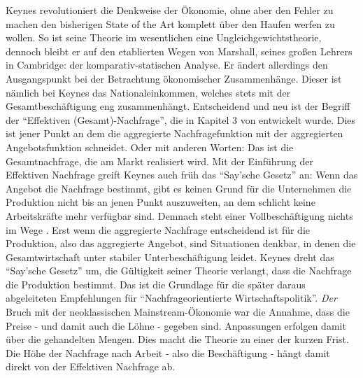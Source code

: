 Keynes revolutioniert die Denkweise der Ökonomie, ohne aber den Fehler zu machen den bisherigen State of the Art komplett über den Haufen werfen zu wollen. So ist seine Theorie im wesentlichen eine Ungleichgewichtstheorie, dennoch bleibt er auf den etablierten Wegen von Marshall, seines großen Lehrers in Cambridge: der komparativ-statischen Analyse. Er ändert allerdings den Ausgangspunkt bei der Betrachtung ökonomischer Zusammenhänge. Dieser ist nämlich bei Keynes das Nationaleinkommen, welches stets mit der Gesamtbeschäftigung eng zusammenhängt. Entscheidend und neu ist der Begriff der "`Effektiven (Gesamt)-Nachfrage"', die in Kapitel 3 von \textcite[S. 25]{Keynes1936} entwickelt wurde. Dies ist jener Punkt an dem die aggregierte Nachfragefunktion mit der aggregierten Angebotsfunktion schneidet. Oder mit anderen Worten: Das ist die Gesamtnachfrage, die am Markt realisiert wird. Mit der Einführung der Effektiven Nachfrage greift Keynes auch früh das "`Say'sche Gesetz"' an: Wenn das Angebot die Nachfrage bestimmt, gibt es keinen Grund für die Unternehmen die Produktion nicht bis an jenen Punkt auszuweiten, an dem schlicht keine Arbeitskräfte mehr verfügbar sind. Demnach steht einer Vollbeschäftigung nichts im Wege \parencite[S. 26]{Keynes1936}. Erst wenn die aggregierte Nachfrage entscheidend ist für die Produktion, also das aggregierte Angebot, sind Situationen denkbar, in denen die Gesamtwirtschaft unter stabiler Unterbeschäftigung leidet. Keynes dreht das "`Say'sche Gesetz"' um, die Gültigkeit seiner Theorie verlangt, dass die Nachfrage die Produktion bestimmt. Das ist die Grundlage für die später daraus abgeleiteten Empfehlungen für "`Nachfrageorientierte Wirtschaftspolitik"'. \textit{Der} Bruch mit der neoklassischen Mainstream-Ökonomie war die Annahme, dass die Preise - und damit auch die Löhne - gegeben sind\parencite[S. 58]{Snowdon2005}. Anpassungen erfolgen damit über die gehandelten Mengen. Dies macht die Theorie zu einer der kurzen Frist. Die Höhe der Nachfrage nach Arbeit - also die Beschäftigung - hängt damit direkt von der Effektiven Nachfrage ab.

